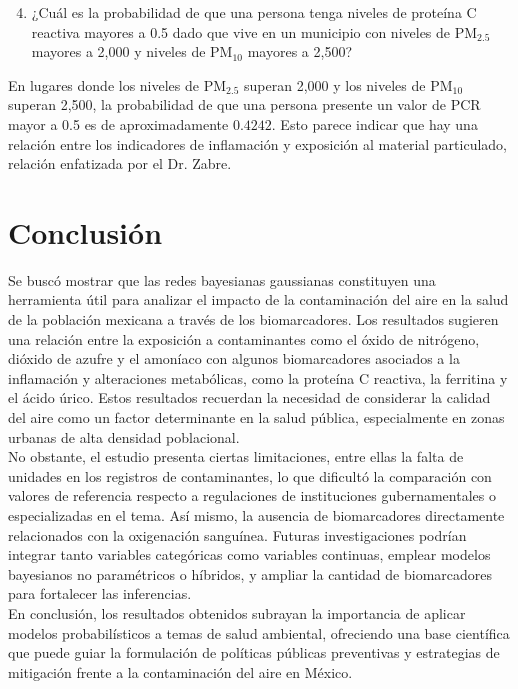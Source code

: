 \documentclass[12pt, letterpaper]{report}
\begin{document}
\begin{enumerate}
    \setcounter{enumi}{3}    
    \item ¿Cuál es la probabilidad de que una persona tenga niveles de proteína C reactiva mayores a 0.5 dado que vive en un municipio con niveles de \( \text{PM}_{2.5} \) mayores a 2,000 y niveles de \( \text{PM}_{10} \) mayores a 2,500?
\end{enumerate}

En lugares donde los niveles de \( \text{PM}_{2.5} \) superan 2,000 y los niveles de \( \text{PM}_{10} \) superan 2,500, la probabilidad de que una persona presente un valor de PCR mayor a 0.5 es de aproximadamente \(0.4242\). Esto parece indicar que hay una relación entre los indicadores de inflamación y exposición al material particulado, relación enfatizada por el Dr. Zabre.


\section*{Conclusión}

Se buscó mostrar que las redes bayesianas gaussianas constituyen una herramienta útil para analizar el impacto de la contaminación del aire en la salud de la población mexicana a través de los biomarcadores. Los resultados sugieren una relación entre la exposición a contaminantes como el óxido de nitrógeno, dióxido de azufre y el amoníaco con algunos biomarcadores asociados a la inflamación y alteraciones metabólicas, como la proteína C reactiva, la ferritina y el ácido úrico. Estos resultados recuerdan la necesidad de considerar la calidad del aire como un factor determinante en la salud pública, especialmente en zonas urbanas de alta densidad poblacional.
\\

No obstante, el estudio presenta ciertas limitaciones, entre ellas la falta de unidades en los registros de contaminantes, lo que dificultó la comparación con valores de referencia respecto a regulaciones de instituciones gubernamentales o especializadas en el tema. Así mismo, la ausencia de biomarcadores directamente relacionados con la oxigenación sanguínea. Futuras investigaciones podrían integrar tanto variables categóricas como variables continuas, emplear modelos bayesianos no paramétricos o híbridos, y ampliar la cantidad de biomarcadores para fortalecer las inferencias.
\\

En conclusión, los resultados obtenidos subrayan la importancia de aplicar modelos probabilísticos a temas de salud ambiental, ofreciendo una base científica que puede guiar la formulación de políticas públicas preventivas y estrategias de mitigación frente a la contaminación del aire en México.


\printbibliography[title={Referencias}]
\end{document}
